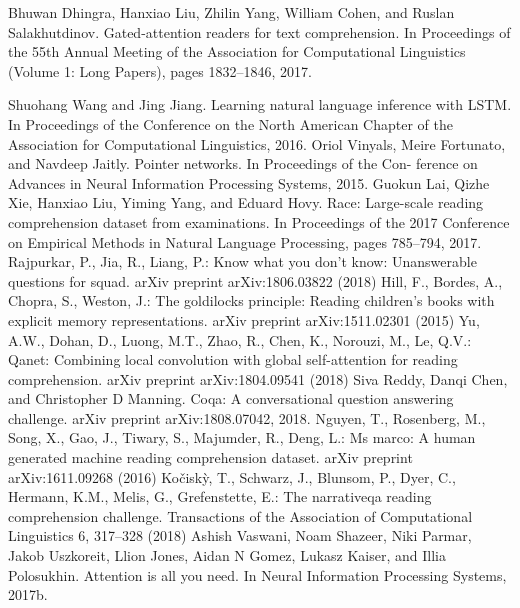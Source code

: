 \documentclass{article}
\begin{document}
\begin{thebibliography}{99}
    Bhuwan Dhingra, Hanxiao Liu, Zhilin Yang, William Cohen, and Ruslan Salakhutdinov.
    Gated-attention readers for text comprehension. In Proceedings of the 55th Annual Meeting
    of the Association for Computational Linguistics (Volume 1: Long Papers), pages 1832–1846,
    2017.

    Shuohang Wang and Jing Jiang. Learning natural language inference with LSTM. In Proceedings of
    the Conference on the North American Chapter of the Association for Computational Linguistics,
    2016.
    Oriol Vinyals, Meire Fortunato, and Navdeep Jaitly. Pointer networks. In Proceedings of the Con-
    ference on Advances in Neural Information Processing Systems, 2015.
    Guokun Lai, Qizhe Xie, Hanxiao Liu, Yiming Yang, and Eduard Hovy. Race: Large-scale
    reading comprehension dataset from examinations. In Proceedings of the 2017 Conference
    on Empirical Methods in Natural Language Processing, pages 785–794, 2017.
    Rajpurkar, P., Jia, R., Liang, P.: Know what you don’t know: Unanswerable questions for
    squad. arXiv preprint arXiv:1806.03822 (2018)
    Hill, F., Bordes, A., Chopra, S., Weston, J.: The goldilocks principle: Reading children’s
    books with explicit memory representations. arXiv preprint arXiv:1511.02301 (2015)
    Yu, A.W., Dohan, D., Luong, M.T., Zhao, R., Chen, K., Norouzi, M., Le, Q.V.: Qanet:
    Combining local convolution with global self-attention for reading comprehension. arXiv
    preprint arXiv:1804.09541 (2018)
    Siva Reddy, Danqi Chen, and Christopher D Manning. Coqa: A conversational question answering
    challenge. arXiv preprint arXiv:1808.07042, 2018.
    Nguyen, T., Rosenberg, M., Song, X., Gao, J., Tiwary, S., Majumder, R., Deng, L.:
    Ms marco: A human generated machine reading comprehension dataset. arXiv preprint
    arXiv:1611.09268 (2016)
    Kočiskỳ, T., Schwarz, J., Blunsom, P., Dyer, C., Hermann, K.M., Melis, G., Grefenstette,
    E.: The narrativeqa reading comprehension challenge. Transactions of the Association of
    Computational Linguistics 6, 317–328 (2018)
    Ashish Vaswani, Noam Shazeer, Niki Parmar, Jakob Uszkoreit, Llion Jones, Aidan N Gomez,
    Lukasz Kaiser, and Illia Polosukhin. Attention is all you need. In Neural Information Processing
    Systems, 2017b.


\end{thebibliography}
\end{document}
